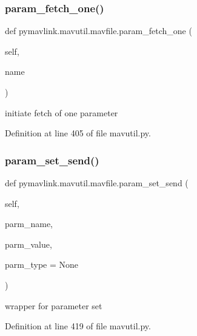\subsubsection{\texorpdfstring{param\_fetch\_one()}{param\_fetch\_one()}}
{\footnotesize\ttfamily def pymavlink.\+mavutil.\+mavfile.\+param\+\_\+fetch\+\_\+one (\begin{DoxyParamCaption}\item[{}]{self,  }\item[{}]{name }\end{DoxyParamCaption})}

\begin{DoxyVerb}initiate fetch of one parameter\end{DoxyVerb}
 

Definition at line 405 of file mavutil.\+py.

\mbox{\label{classpymavlink_1_1mavutil_1_1mavfile_a28ff487ffd14ae2366c6dbc65f2c8612}} 
\subsubsection{\texorpdfstring{param\_set\_send()}{param\_set\_send()}}
{\footnotesize\ttfamily def pymavlink.\+mavutil.\+mavfile.\+param\+\_\+set\+\_\+send (\begin{DoxyParamCaption}\item[{}]{self,  }\item[{}]{parm\+\_\+name,  }\item[{}]{parm\+\_\+value,  }\item[{}]{parm\+\_\+type = {\ttfamily None} }\end{DoxyParamCaption})}

\begin{DoxyVerb}wrapper for parameter set\end{DoxyVerb}
 

Definition at line 419 of file mavutil.\+py.

\mbox{\label{classpymavlink_1_1mavutil_1_1mavfile_a6307d32e7cc751320cb1fe84a1a43049}} 
